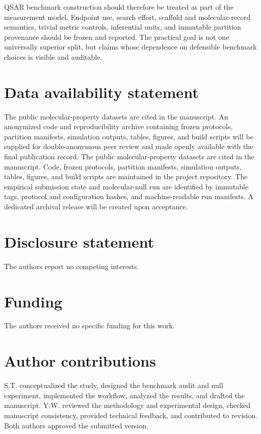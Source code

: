 QSAR benchmark construction should therefore be treated as part of the measurement model. Endpoint use, search effort, scaffold and molecular-record semantics, trivial metric controls, inferential units, and immutable partition provenance should be frozen and reported. The practical goal is not one universally superior split, but claims whose dependence on defensible benchmark choices is visible and auditable.

\section*{Data availability statement}
\ifanonymous
The public molecular-property datasets are cited in the manuscript. An anonymized code and reproducibility archive containing frozen protocols, partition manifests, simulation outputs, tables, figures, and build scripts will be supplied for double-anonymous peer review and made openly available with the final publication record.
\else
The public molecular-property datasets are cited in the manuscript. Code, frozen protocols, partition manifests, simulation outputs, tables, figures, and build scripts are maintained in the project repository. The empirical submission state and molecular-null run are identified by immutable tags, protocol and configuration hashes, and machine-readable run manifests. A dedicated archival release will be created upon acceptance.
\fi

\section*{Disclosure statement}
The authors report no competing interests.

\section*{Funding}
The authors received no specific funding for this work.

\ifanonymous\else
\section*{Author contributions}
S.T. conceptualized the study, designed the benchmark audit and null experiment, implemented the workflow, analyzed the results, and drafted the manuscript. Y.W. reviewed the methodology and experimental design, checked manuscript consistency, provided technical feedback, and contributed to revision. Both authors approved the submitted version.

